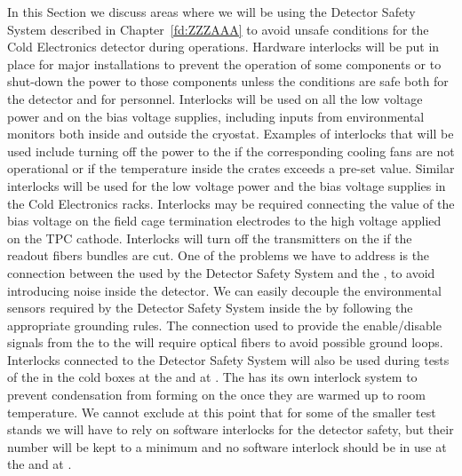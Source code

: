 In this Section we discuss areas where we will be using
the Detector Safety System described in Chapter~\ref{fd:ZZZAAA}
to avoid unsafe conditions for the Cold Electronics detector 
during operations. Hardware interlocks will be put in place
for major installations to prevent the operation of some 
components or to shut-down the power to those components 
unless the conditions are safe
both for the detector and for personnel. Interlocks will be
used on all the low voltage power and on the bias voltage 
supplies, including inputs from environmental monitors both
inside and outside the cryostat. Examples of interlocks that
will be used include turning off the power to the 
if the corresponding cooling fans are not operational or
if the temperature inside the crates exceeds a pre-set value.
Similar interlocks will be used for the low voltage power
and the bias voltage supplies in the Cold Electronics racks.
Interlocks may be required connecting the value of the 
bias voltage on the field cage termination electrodes to the
high voltage applied on the TPC cathode. Interlocks will turn 
off the transmitters on the  if the readout fibers 
bundles are cut. One of the problems we have to address is 
the connection between the  used by the Detector 
Safety System and the , to avoid introducing noise 
inside the detector. We can easily decouple the environmental 
sensors required by the Detector Safety System inside the 
 by following the appropriate grounding rules. 
The connection used to provide the enable/disable signals 
from the  to the  will require optical 
fibers to avoid possible ground loops. Interlocks connected
to the Detector Safety System will also be used during tests 
of the  in the cold boxes at the  and 
at \surf. The  has its own interlock system to
prevent condensation from forming on the  once
they are warmed up to room temperature. We cannot exclude at
this point that for some of the smaller test stands we will 
have to rely on software interlocks for the detector safety,
but their number will be kept to a minimum and no software
interlock should be in use at the  and at \surf.
